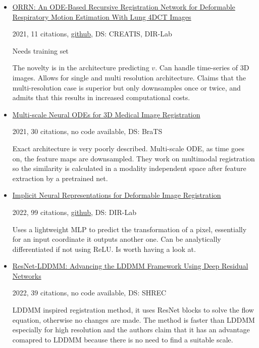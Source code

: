 \documentclass{article}
\begin{document}
\begin{itemize}

\item \href{https://arxiv.org/abs/2305.14673}{ORRN: An ODE-Based Recursive Registration Network for Deformable Respiratory Motion Estimation With Lung 4DCT Images}

2021, 11 citations, \href{https://github.com/Lancial/orrn_public}{github}, DS: CREATIS, DIR-Lab

Needs training set

The novelty is in the architecture predicting $v$. Can handle time-series of 3D images. Allows for single and multi resolution architecture. Claims that the multi-resolution case is superior but only downsamples once or twice, and admits that this results in increased computational costs.

\item \href{https://arxiv.org/abs/2106.08493}{Multi-scale Neural ODEs for 3D Medical Image Registration}

2021, 30 citations, no code available, DS: BraTS

Exact architecture is very poorly described. Multi-scale ODE, as time goes on, the feature maps are downsampled. They work on multimodal registration so the similarity is calculated in a modality independent space after feature extraction by a pretrained net.

\item \href{https://proceedings.mlr.press/v172/wolterink22a.html}{Implicit Neural Representations for Deformable Image Registration}

2022, 99 citations, \href{https://github.com/MIAGroupUT/IDIR}{github}, DS: DIR-Lab

Uses a lightweight MLP to predict the transformation of a pixel, essentially for an input coordinate it outputs another one. Can be analytically differentiated if not using ReLU. Is worth having a look at.

\item \href{https://arxiv.org/pdf/2102.07951}{ResNet-LDDMM: Advancing the LDDMM
Framework Using Deep Residual Networks}

2022, 39 citations, no code available, DS: SHREC

LDDMM inspired registration method, it uses ResNet blocks to solve the flow equation, otherwise no changes are made. The method is faster than LDDMM especially for high resolution and the authors claim that it has an advantage comapred to LDDMM because there is no need to find a suitable scale.


\end{itemize}
\end{document}
